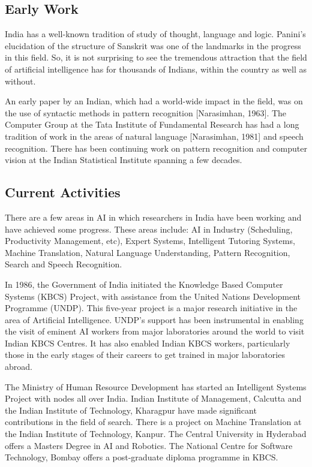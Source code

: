 \subsection{Early Work}
India has a well-known tradition of study of thought, language and logic.
Panini's elucidation of the structure of Sanskrit was one of the 
landmarks in the progress in this field. So, it is not
surprising to see the tremendous attraction that the field of 
artificial intelligence has for thousands of Indians, within the 
country as well as without. 

An early paper by an Indian, which had a world-wide impact in the field,
was on the use of syntactic methods in pattern recognition [Narasimhan, 1963]. 
The Computer Group at the Tata Institute of Fundamental Research has 
had a long tradition of 
work in the areas of natural language [Narasimhan, 1981] and
speech recognition. There has been continuing work on pattern 
recognition and computer vision 
at the Indian Statistical 
Institute spanning a few decades.

\subsection{Current Activities}
There are a few areas in AI in which researchers in India have
been working and have achieved some progress. These areas
include: 
AI in Industry (Scheduling, Productivity Management, etc), 
Expert Systems, Intelligent Tutoring Systems, 
Machine Translation, 
Natural Language Understanding,
Pattern Recognition, 
Search and Speech Recognition. 

In 1986, the Government of India initiated the Knowledge Based
Computer Systems (KBCS) Project, with assistance from
the United Nations Development Programme (UNDP).
This five-year project is a major research initiative 
in the area of Artificial Intelligence. UNDP's support 
has been instrumental in enabling the visit of eminent 
AI workers from major laboratories around the world to visit 
Indian KBCS Centres. It has also enabled Indian KBCS workers, 
particularly those in the early stages of their careers to get trained
in major laboratories abroad. 

The Ministry of
Human Resource Development has started an Intelligent
Systems Project with nodes all over India. 
Indian Institute of Management, Calcutta and the Indian Institute
of Technology, Kharagpur have made significant contributions
in the field of search.  There is 
a project on Machine Translation at the Indian Institute of
Technology, Kanpur.  The Central University in Hyderabad offers a
Masters Degree in AI and Robotics. The National Centre for Software 
Technology, Bombay offers a post-graduate diploma programme in 
KBCS.

